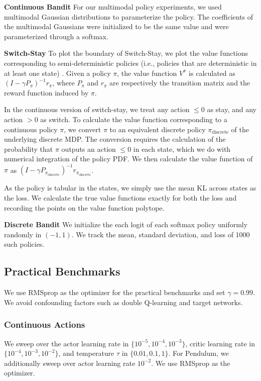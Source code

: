 \documentclass{article}
\newcommand{\vpi}{V^\pi}
\begin{document}
\textbf{Continuous Bandit}
For our multimodal policy experiments, we used multimodal Gaussian distributions to parameterize the policy. The coefficients of the multimodal Gaussians were initialized to be the same value and were parameterized through a softmax. 

\textbf{Switch-Stay}
To plot the boundary of Switch-Stay, we plot the value functions corresponding to semi-deterministic policies (i.e., policies that are deterministic in at least one state) \citep{dadashi2019value}. Given a policy $\pi$, the value function $\vpi$ is calculated as $(I - \gamma P_\pi)^{-1}r_\pi$, where $P_\pi$ and $r_\pi$ are respectively the transition matrix and the reward function induced by $\pi$. 

In the continuous version of switch-stay, we treat any action $ \leq 0$ as stay, and any action $ > 0$ as switch. To calculate the value function corresponding to a continuous policy $\pi$, we convert $\pi$ to an equivalent discrete policy $\pi_{\mathrm{discrete}}$ of the underlying discrete MDP. The conversion requires the calculation of the probability that $\pi$ outputs an action $\leq 0$ in each state, which we do with numerical integration of the policy PDF. We then calculate the value function of $\pi$ as $(I - \gamma P_{\pi_{\mathrm{discrete}}})^{-1}r_{\pi_{\mathrm{discrete}}}$.

As the policy is tabular in the states, we simply use the mean KL across states as the loss. We calculate the true value functions exactly for both the loss and recording the points on the value function polytope. 

\textbf{Discrete Bandit}
We initialize the each logit of each softmax policy uniformly randomly in $(-1, 1)$. We track the mean, standard deviation, and loss of 1000 such policies.

\subsection{Practical Benchmarks}
We use RMSprop \citep{tieleman2012lecture} as the optimizer for the practical benchmarks and set $\gamma = 0.99$. We avoid confounding factors such as double Q-learning \citep{hasselt2010double} and target networks. 


\subsubsection{Continuous Actions}
We sweep over the actor learning rate in $\{10^{-5}, 10^{-4}, 10^{-3}\}$, critic learning rate in $\{10^{-4}, 10^{-3}, 10^{-2}\}$, and temperature $\tau$ in $\{0.01, 0.1, 1\}$. For Pendulum, we additionally sweep over actor learning rate $10^{-2}$.
We use RMSprop \citep{tieleman2012lecture} as the optimizer. 
\end{document}
